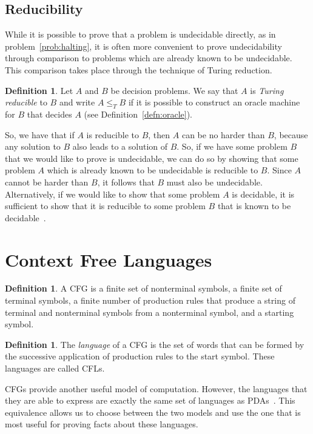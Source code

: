 \documentclass[psamsfonts]{amsart}
\theoremstyle{definition}
\newtheorem{defn}[thm]{Definition}
\theoremstyle{remark}
\numberwithin{equation}{section}
\begin{document}
\subsection{Reducibility}
\label{subsec:reducibility}
While it is possible to prove that a problem is undecidable directly, as in
problem~\ref{prob:halting}, it is often more convenient to prove undecidability
through comparison to problems which are already known to be undecidable. This
comparison takes place through the technique of Turing reduction.
\begin{defn}
  Let $A$ and $B$ be decision problems. We say that $A$ is \emph{Turing reducible}
  to $B$ and write $A \leq_T B$ if it is possible to construct an oracle
  machine for $B$ that decides $A$ (see
  Definition~\ref{defn:oracle}).
\end{defn}
So, we have that if $A$ is reducible to $B$, then $A$ can be no harder than $B$,
because any solution to $B$ also leads to a solution of $B$. So, if we have some
problem $B$ that we would like to prove is undecidable, we can do so by showing
that some problem $A$ which is already known to be undecidable is reducible to
$B$. Since $A$ cannot be harder than $B$, it follows that $B$ must also be
undecidable. Alternatively, if we would like to show that some problem $A$ is
decidable, it is sufficient to show that it is reducible to some problem $B$
that is known to be decidable~\cite{sipser13:_introd_theor_comput,post44:_recur,kleene80_introd}.

\section{Context Free Languages}

\begin{defn}
 A \ac{CFG} is a finite set of nonterminal symbols, a finite set of terminal
 symbols, a finite number of production rules that produce a string of terminal
 and nonterminal symbols from a nonterminal symbol, and a starting symbol.
\end{defn}

\begin{defn}
  The \emph{language} of a \ac{CFG} is the set of words that can be formed by
  the successive application of production rules to the start symbol. These
  languages are called \acp{CFL}.
\end{defn}

\acp{CFG} provide another useful model of computation. However, the languages
that they are able to
express are exactly the same set of languages as \acp{PDA}~\cite{hopcroft07:_introd_autom_theor_languag_comput}. This equivalence allows
us to choose between the two models and use the one that is most useful for
proving facts about these languages.
\end{document}
